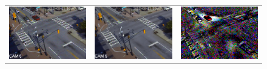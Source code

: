 \documentclass[10pt,journal,compsoc, onecolumn]{IEEEtran}
\begin{document}
\begin{figure}[th!]
\begin{tabular}{ccc}
\includegraphics[height=\hght,width=\wdth]{fig/input4000.png} &  
\includegraphics[height=\hght,width=\wdth]{fig/lr4000.png}&
\includegraphics[height=\hght,width=\wdth]{fig/err4000-edit.png} \\

\end{tabular}
\end{figure}
\end{document}
